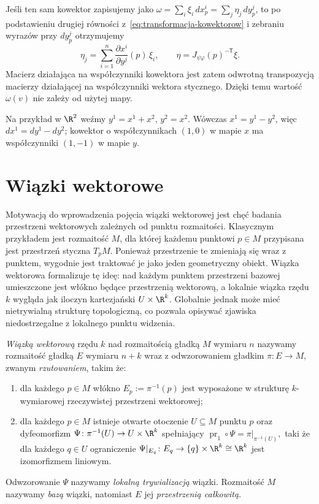 Jeśli ten sam kowektor zapisujemy jako
$\omega=\sum_i\xi_i\,dx^i_p=\sum_j\eta_j\,dy^j_p$,
to po podstawieniu drugiej równości z~\eqref{eq:transformacja-kowektorow}
i zebraniu wyrazów przy $dy^j_p$ otrzymujemy
\begin{equation}\label{eq:transformacja-wspolrzednych-kowektora}
\boxed{\quad
\eta_j=\sum_{i=1}^n\frac{\partial x^i}{\partial y^j}(p)\,\xi_i,
\qquad
\eta=J_{\psi\varphi}(p)^{-\mathsf T}\xi .
\quad}
\end{equation}
Macierz działająca na współczynniki kowektora jest zatem
odwrotną transpozycją macierzy działającej na współczynniki
wektora stycznego. Dzięki temu wartość $\omega(v)$ nie zależy
od użytej mapy.

Na przykład w $\R^2$ weźmy $y^1=x^1+x^2$, $y^2=x^2$.
Wówczas $x^1=y^1-y^2$, więc
$dx^1=dy^1-dy^2$; kowektor o współczynnikach $(1,0)$
w mapie $x$ ma współczynniki $(1,-1)$ w mapie $y$.

\section{Wiązki wektorowe}\label{sec:wiazki-wektorowe}
Motywacją do wprowadzenia pojęcia wiązki wektorowej jest chęć badania przestrzeni wektorowych zależnych od punktu rozmaitości. Klasycznym przykładem jest rozmaitość $M$, dla której każdemu punktowi $p \in M$ przypisana jest przestrzeń styczna $T_pM$. Ponieważ przestrzenie te zmieniają się wraz z punktem, wygodnie jest traktować je jako jeden geometryczny obiekt. Wiązka wektorowa formalizuje tę ideę: nad każdym punktem przestrzeni bazowej umieszczone jest włókno będące przestrzenią wektorową, a lokalnie wiązka rzędu $k$ wygląda jak iloczyn kartezjański $U \times \R^k$. Globalnie jednak może mieć nietrywialną strukturę topologiczną, co pozwala opisywać zjawiska niedostrzegalne z lokalnego punktu widzenia.
\begin{definicja}
\label{def:wiazka-wektorowa}
\emph{Wiązką wektorową} rzędu $k$ nad rozmaitością gładką $M$
wymiaru $n$ nazywamy rozmaitość gładką $E$ wymiaru $n+k$ wraz
z odwzorowaniem gładkim
$
\pi\colon E\to M,
$
zwanym \emph{rzutowaniem}, takim że:
\begin{enumerate}[label=(\roman*)]
\item dla każdego $p\in M$ włókno
$
E_p:=\pi^{-1}(p)
$
jest wyposażone w strukturę $k$-wymiarowej rzeczywistej przestrzeni
wektorowej;

\item dla każdego $p\in M$ istnieje otwarte otoczenie $U\subseteq M$
punktu $p$ oraz dyfeomorfizm
$
\Psi\colon \pi^{-1}(U)\to U\times\R^k
$
spełniający
$
\operatorname{pr}_1\circ\Psi
=
\pi|_{\pi^{-1}(U)},
$
taki że dla każdego $q\in U$ ograniczenie
$
\Psi|_{E_q}\colon E_q\to\{q\}\times\R^k\cong\R^k
$
jest izomorfizmem liniowym.
\end{enumerate}
Odwzorowanie $\Psi$ nazywamy \emph{lokalną trywializacją} wiązki.
Rozmaitość $M$ nazywamy \emph{bazą} wiązki, natomiast $E$ jej
\emph{przestrzenią całkowitą}.
\end{definicja}

